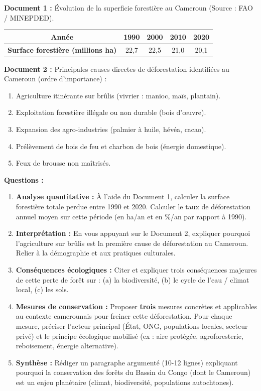 \documentclass[11pt]{article}
\begin{document}
\begin{exercice}
\textbf{Document 1 :} Évolution de la superficie forestière au Cameroun (Source : FAO / MINEPDED).
\begin{center}
\begin{tabular}{|c|c|c|c|c|}\hline
\rowcolor{popblueL}
\textbf{Année} & 1990 & 2000 & 2010 & 2020 \\ \hline
\textbf{Surface forestière (millions ha)} & 22,7 & 22,5 & 21,0 & 20,1 \\ \hline
\end{tabular}
\end{center}

\textbf{Document 2 :} Principales causes directes de déforestation identifiées au Cameroun (ordre d'importance) :
\begin{enumerate}
    \item Agriculture itinérante sur brûlis (vivrier : manioc, maïs, plantain).
    \item Exploitation forestière illégale ou non durable (bois d'œuvre).
    \item Expansion des agro-industries (palmier à huile, hévéa, cacao).
    \item Prélèvement de bois de feu et charbon de bois (énergie domestique).
    \item Feux de brousse non maîtrisés.
\end{enumerate}

\textbf{Questions :}
\begin{enumerate}
    \item \textbf{Analyse quantitative :} À l'aide du Document 1, calculer la surface forestière totale perdue entre 1990 et 2020. Calculer le taux de déforestation annuel moyen sur cette période (en \si{ha/an} et en \%/an par rapport à 1990).
    \item \textbf{Interprétation :} En vous appuyant sur le Document 2, expliquer pourquoi l'agriculture sur brûlis est la première cause de déforestation au Cameroun. Relier à la démographie et aux pratiques culturales.
    \item \textbf{Conséquences écologiques :} Citer et expliquer trois conséquences majeures de cette perte de forêt sur : (a) la biodiversité, (b) le cycle de l'eau / climat local, (c) les sols.
    \item \textbf{Mesures de conservation :} Proposer \textbf{trois} mesures concrètes et applicables au contexte camerounais pour freiner cette déforestation. Pour chaque mesure, préciser l'acteur principal (État, ONG, populations locales, secteur privé) et le principe écologique mobilisé (ex : aire protégée, agroforesterie, reboisement, énergie alternative).
    \item \textbf{Synthèse :} Rédiger un paragraphe argumenté (10-12 lignes) expliquant pourquoi la conservation des forêts du Bassin du Congo (dont le Cameroun) est un enjeu planétaire (climat, biodiversité, populations autochtones).
\end{enumerate}
\end{exercice}
\end{document}
